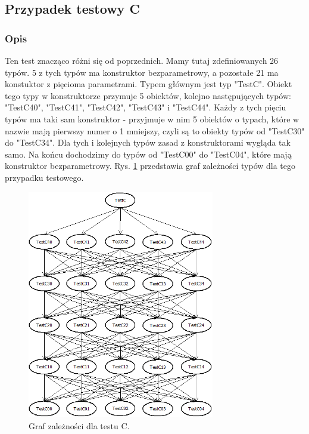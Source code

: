 \documentclass[12pt]{article}
\begin{document}
\subsection{Przypadek testowy C}
\subsubsection{Opis}
Ten test znacząco różni się od poprzednich. Mamy tutaj zdefiniowanych 26 typów. 5 z tych typów ma konstruktor bezparametrowy, a pozostałe 21 ma konstuktor z pięcioma parametrami. Typem głównym jest typ "TestC". Obiekt tego typy w konstruktorze przymuje 5 obiektów, kolejno następujących typów: "TestC40", "TestC41", "TestC42", "TestC43" i "TestC44". Każdy z tych pięciu typów ma taki sam konstruktor - przyjmuje w nim 5 obiektów o typach, które w nazwie mają pierwszy numer o 1 mniejszy, czyli są to obiekty typów od "TestC30" do "TestC34". Dla tych i kolejnych typów zasad z konstruktorami wygląda tak samo. Na końcu dochodzimy do typów od "TestC00" do "TestC04", które mają konstruktor bezparametrowy. Rys. \ref{fig:testC} przedstawia graf zależności typów dla tego przypadku testowego.

\begin{figure}[h]
	\begin{center}
  		\includegraphics[height=10cm]{TestC.png}
  		\caption{Graf zależności dla testu C.}
  		\label{fig:testC}
	\end{center}
\end{figure}
\end{document}
